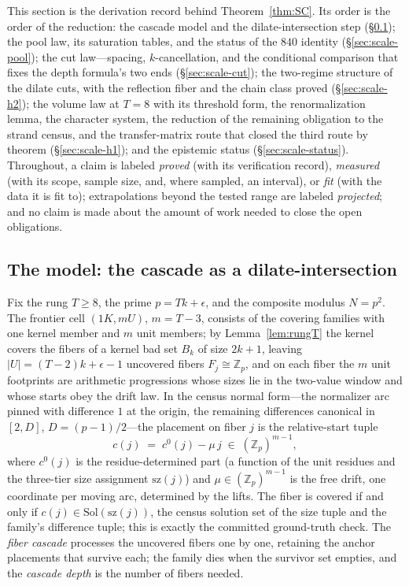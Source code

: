 \documentclass[11pt,a4paper]{article}
\numberwithin{equation}{section}
\theoremstyle{plain}
\theoremstyle{definition}
\theoremstyle{remark}
\newcommand{\Z}{\mathbb{Z}}
\begin{document}
This section is the derivation record behind Theorem~\ref{thm:SC}. Its
order is the order of the reduction: the cascade model and the
dilate-intersection step (\S\ref{sec:scale-model}); the pool law, its
saturation tables, and the status of the $840$ identity
(\S\ref{sec:scale-pool}); the cut law---spacing, $k$-cancellation, and
the conditional comparison that fixes the depth formula's two ends
(\S\ref{sec:scale-cut}); the two-regime structure of the dilate cuts,
with the reflection fiber and the chain class proved
(\S\ref{sec:scale-h2}); the volume law at $T=8$ with its
threshold form, the renormalization lemma, the character system, the
reduction of the remaining obligation to the strand
census, and the transfer-matrix route that closed the third route by
theorem (\S\ref{sec:scale-h1}); and the epistemic status
(\S\ref{sec:scale-status}). Throughout, a claim is labeled
\emph{proved} (with its verification record), \emph{measured} (with its
scope, sample size, and, where sampled, an interval), or \emph{fit}
(with the data it is fit to); extrapolations beyond the tested range
are labeled \emph{projected}; and no claim is made about the
amount of work needed to close the open obligations.

\subsection{The model: the cascade as a dilate-intersection}\label{sec:scale-model}

Fix the rung $T\ge 8$, the prime $p=Tk+\epsilon$, and the composite
modulus $N=p^2$. The frontier cell $(1K,mU)$, $m=T-3$, consists of the
covering families with one kernel member and $m$ unit members; by
Lemma~\ref{lem:rungT} the kernel covers the fibers of a kernel bad set
$B_k$ of size $2k+1$, leaving $|U|=(T-2)k+\epsilon-1$ uncovered fibers
$F_j\cong\Z_p$, and on each fiber the $m$ unit footprints are arithmetic
progressions whose sizes lie in the two-value window and whose starts
obey the drift law. In the census normal form---the normalizer arc
pinned with difference $1$ at the origin, the remaining differences
canonical in $[2,D]$, $D=(p-1)/2$---the placement on fiber $j$ is the
relative-start tuple
\[
c(j)\;=\;c^0(j)-\mu\,j\;\in\;(\Z_p)^{m-1},
\]
where $c^0(j)$ is the residue-determined part (a function of the unit
residues and the three-tier size assignment $\mathrm{sz}(j)$) and
$\mu\in(\Z_p)^{m-1}$ is the free drift, one coordinate per moving arc,
determined by the lifts. The fiber is covered if and only if
$c(j)\in\mathrm{Sol}(\mathrm{sz}(j))$, the census solution set of the
size tuple and the family's difference tuple; this is exactly the
committed ground-truth check. The \emph{fiber cascade} processes the
uncovered fibers one by one, retaining the anchor placements that
survive each; the family dies when the survivor set empties, and the
\emph{cascade depth} is the number of fibers needed.
\end{document}
